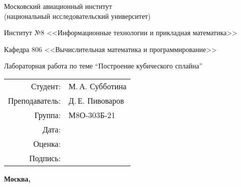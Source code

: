 \begin{titlepage}
\begin{center}
\bfseries

{\Large Московский авиационный институт\\ (национальный исследовательский университет)

}

\vspace{48pt}

{\large Институт №8 <<Информационные технологии и прикладная математика>>
}

\vspace{36pt}

{\large Кафедра 806 <<Вычислительная математика и программирование>>

}


\vspace{48pt}

Лабораторная работа по теме \enquote{Построение кубического сплайна}

\end{center}

\vspace{72pt}

\begin{flushright}
\begin{tabular}{rl}
Студент: & М.\,А. Субботина \\
Преподаватель: & Д.\,Е. Пивоваров \\
Группа: & М8О-303Б-21 \\
Дата: & \\
Оценка: & \\
Подпись: & \\
\end{tabular}
\end{flushright}

\vfill

\begin{center}
\bfseries
Москва, \the\year
\end{center}
\end{titlepage}

\pagebreak
